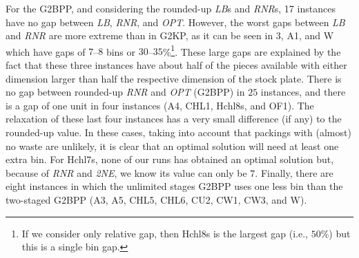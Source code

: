 \documentclass[9pt]{entcs}
\begin{document}
For the G2BPP, and considering the rounded-up \emph{LB}s and \emph{RNR}s, 17 instances have no gap between \emph{LB}, \emph{RNR}, and \emph{OPT}.
However, the worst gaps between \emph{LB} and \emph{RNR} are more extreme than in G2KP, as it can be seen in 3, A1, and W which have gaps of \(7\)--\(8\) bins or \(30\)--\(35\)\%\footnote{If we consider only relative gap, then Hchl8s is the largest gap (i.e., \(50\)\%) but this is a single bin gap.}.
These large gaps are explained by the fact that these three instances have about half of the pieces available with either dimension larger than half the respective dimension of the stock plate.
There is no gap between rounded-up \emph{RNR} and \emph{OPT} (G2BPP) in \(25\) instances, and there is a gap of one unit in four instances (A4, CHL1, Hchl8s, and OF1).
The relaxation of these last four instances has a very small difference (if any) to the rounded-up value.
In these cases, taking into account that packings with (almost) no waste are unlikely, it is clear that an optimal solution will need at least one extra bin.
For Hchl7s, none of our runs has obtained an optimal solution but, because of \emph{RNR} and \emph{2NE}, we know its value can only be \(7\).
Finally, there are eight instances in which the unlimited stages G2BPP uses one less bin than the two-staged G2BPP (A3, A5, CHL5, CHL6, CU2, CW1, CW3, and W).
\end{document}
